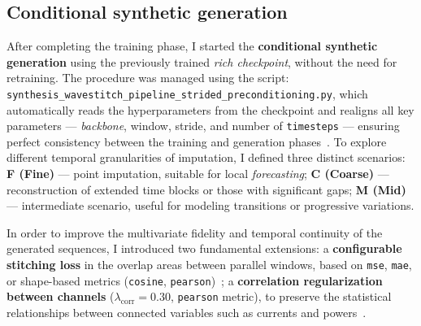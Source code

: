 \subsection{Conditional synthetic generation}

After completing the training phase, I started the \textbf{conditional synthetic generation} using the previously trained \emph{rich checkpoint}, without the need for retraining.  
The procedure was managed using the script:\\
\texttt{synthesis\_wavestitch\_pipeline\_strided\_preconditioning.py},  
which automatically reads the hyperparameters from the checkpoint and realigns all key parameters — \emph{backbone}, window, stride, and number of \texttt{timesteps} — ensuring perfect consistency between the training and generation phases~\cite{wavestitch,ho2020ddpm,dhariwal2021improved}.  
To explore different temporal granularities of imputation, I defined three distinct scenarios: \textbf{F (Fine)} — point imputation, suitable for local \emph{forecasting}; \textbf{C (Coarse)} — reconstruction of extended time blocks or those with significant gaps; \textbf{M (Mid)} — intermediate scenario, useful for modeling transitions or progressive variations.

In order to improve the multivariate fidelity and temporal continuity of the generated sequences, I introduced two fundamental extensions: a \textbf{configurable stitching loss} in the overlap areas between parallel windows, based on \texttt{mse}, \texttt{mae}, or shape-based metrics (\texttt{cosine}, \texttt{pearson})~\cite{dhariwal2021improved,ho2020ddpm}; a \textbf{correlation regularization between channels} (\(\lambda_{\text{corr}} = 0.30\), \texttt{pearson} metric), to preserve the statistical relationships between connected variables such as currents and powers~\cite{bishop2006pattern,hastie2009elements}.


